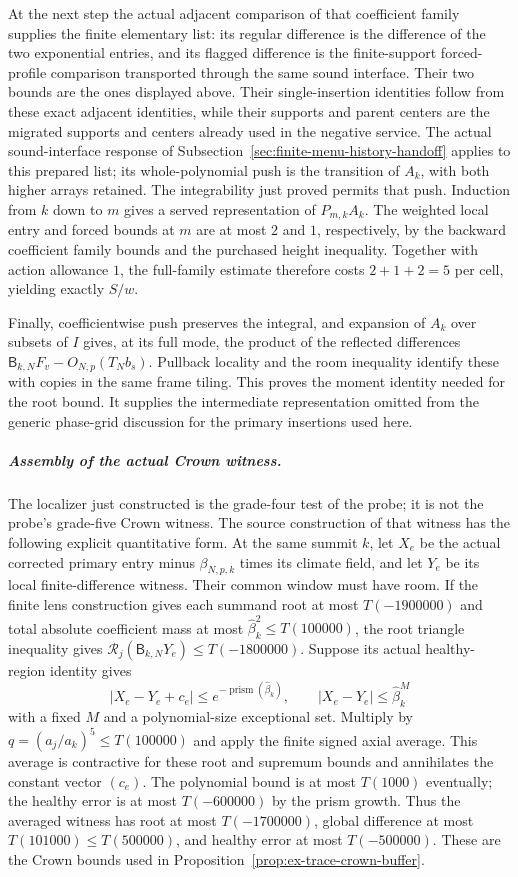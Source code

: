 At the next step the actual adjacent comparison of that coefficient family supplies
the finite elementary list: its regular difference is the difference of
the two exponential entries, and its flagged difference is the
finite-support forced-profile comparison transported through the same
sound interface. Their two bounds are the ones displayed above. Their
single-insertion identities follow from these exact adjacent identities,
while their supports and parent centers are the migrated supports and
centers already used in the negative service. The actual sound-interface
response of Subsection~\ref{sec:finite-menu-history-handoff} applies to
this prepared list; its whole-polynomial push is the transition of
$A_k$, with both higher arrays retained. The integrability just proved
permits that push. Induction from $k$ down to $m$ gives a served
representation of $P_{m,k}A_k$. The weighted local entry and forced
bounds at $m$ are at most $2$ and $1$, respectively, by the backward
coefficient family bounds and the purchased height inequality. Together with action
allowance $1$, the full-family estimate therefore costs $2+1+2=5$
per cell, yielding exactly $S/w$.

Finally, coefficientwise push preserves the integral, and expansion of
$A_k$ over subsets of $I$ gives, at its full mode, the product of the
reflected differences $\mathsf B_{k,N}F_v-O_{N,p}(T_Nb_s)$.
Pullback locality and the room inequality identify these with copies in
the same frame tiling. This proves the moment identity needed for the
root bound. It supplies the intermediate representation omitted from
the generic phase-grid discussion for the primary insertions used here.

\subparagraph{Assembly of the actual Crown witness.}\label{par:trace-actual-crown}
The localizer just constructed is the grade-four test of the probe;
it is not the probe's grade-five Crown witness. The source construction
of that witness has the following explicit quantitative form. At the
same summit $k$, let $X_e$ be the actual corrected primary entry minus
$\beta_{N,p,k}$ times its climate field, and let $Y_e$ be its local
finite-difference witness. Their common window must have room.
If the finite lens construction gives each summand root at most
$T(-1900000)$ and total absolute coefficient mass at most
$\widehat\beta_k^2\le T(100000)$, the root triangle inequality gives
$\mathcal R_j(\mathsf B_{k,N}Y_e)\le T(-1800000)$.
Suppose its actual healthy-region identity gives
\[
 |X_e-Y_e+c_e|\le e^{-\operatorname{prism}(\widehat\beta_k)},
 \qquad |X_e-Y_e|\le\widehat\beta_k^M
\]
with a fixed $M$ and a polynomial-size exceptional set.
Multiply by $q=(a_j/a_k)^5\le T(100000)$ and apply the finite
signed axial average. This average is contractive for these root and
supremum bounds and annihilates the constant vector $(c_e)$.
The polynomial bound is at most $T(1000)$ eventually; the healthy error
is at most $T(-600000)$ by the prism growth. Thus the averaged
witness has root at most $T(-1700000)$, global difference at most
$T(101000)\le T(500000)$, and healthy error at most $T(-500000)$.
These are the Crown bounds used in
Proposition~\ref{prop:ex-trace-crown-buffer}.

